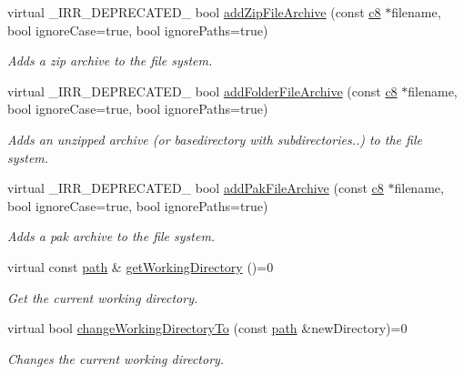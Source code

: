 \begin{DoxyCompactItemize}
virtual \+\_\+\+I\+R\+R\+\_\+\+D\+E\+P\+R\+E\+C\+A\+T\+E\+D\+\_\+ bool \hyperlink{classirr_1_1io_1_1IFileSystem_aef11ff9b5c171d7b3a99d8a79b71f2b3}{add\+Zip\+File\+Archive} (const \hyperlink{namespaceirr_a9395eaea339bcb546b319e9c96bf7410}{c8} $\ast$filename, bool ignore\+Case=true, bool ignore\+Paths=true)
\begin{DoxyCompactList}\small\item\em Adds a zip archive to the file system. \end{DoxyCompactList}\item 
virtual \+\_\+\+I\+R\+R\+\_\+\+D\+E\+P\+R\+E\+C\+A\+T\+E\+D\+\_\+ bool \hyperlink{classirr_1_1io_1_1IFileSystem_a7b5235a1473ff67d97f1487211762723}{add\+Folder\+File\+Archive} (const \hyperlink{namespaceirr_a9395eaea339bcb546b319e9c96bf7410}{c8} $\ast$filename, bool ignore\+Case=true, bool ignore\+Paths=true)
\begin{DoxyCompactList}\small\item\em Adds an unzipped archive (or basedirectory with subdirectories..) to the file system. \end{DoxyCompactList}\item 
virtual \+\_\+\+I\+R\+R\+\_\+\+D\+E\+P\+R\+E\+C\+A\+T\+E\+D\+\_\+ bool \hyperlink{classirr_1_1io_1_1IFileSystem_a5ade21d59a80b16965d57d1977ad6cc4}{add\+Pak\+File\+Archive} (const \hyperlink{namespaceirr_a9395eaea339bcb546b319e9c96bf7410}{c8} $\ast$filename, bool ignore\+Case=true, bool ignore\+Paths=true)
\begin{DoxyCompactList}\small\item\em Adds a pak archive to the file system. \end{DoxyCompactList}\item 
virtual const \hyperlink{namespaceirr_1_1io_a6468281622ce3a1c46b72e19f32dded5}{path} \& \hyperlink{classirr_1_1io_1_1IFileSystem_acbf7342afa6e2fc9583db3e521e66e61}{get\+Working\+Directory} ()=0
\begin{DoxyCompactList}\small\item\em Get the current working directory. \end{DoxyCompactList}\item 
virtual bool \hyperlink{classirr_1_1io_1_1IFileSystem_a8859a2bed44815eeccc4fbcef189b073}{change\+Working\+Directory\+To} (const \hyperlink{namespaceirr_1_1io_a6468281622ce3a1c46b72e19f32dded5}{path} \&new\+Directory)=0
\begin{DoxyCompactList}\small\item\em Changes the current working directory. \end{DoxyCompactList}\item 

\end{DoxyCompactItemize}
